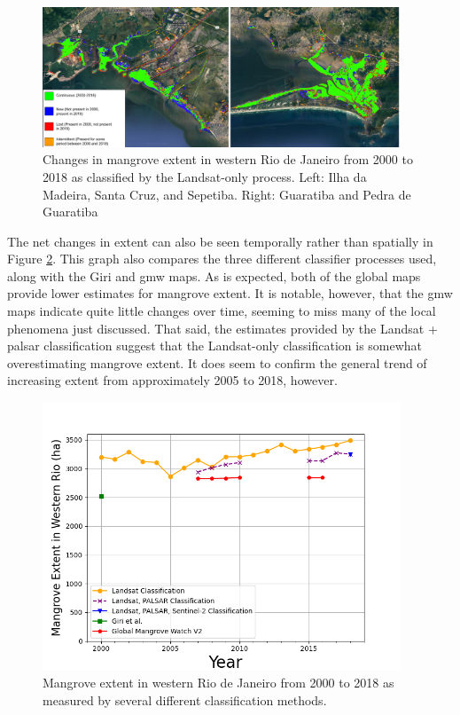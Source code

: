 \begin{figure}[H] 
\centering
\includegraphics[width=0.95\textwidth]{Figures/chap4/extent_changes.png}
\caption[Changes in Mangrove Extent 2000-2018]{Changes in mangrove extent in western Rio de Janeiro from 2000 to 2018 as classified by the Landsat-only process. Left: Ilha da Madeira, Santa Cruz, and Sepetiba. Right: Guaratiba and Pedra de Guaratiba}
\label{fig:extent-changes}
\end{figure}

The net changes in extent can also be seen temporally rather than spatially in Figure \ref{fig:extent-over-time}. This graph also compares the three different classifier processes used, along with the Giri and \ac{gmw} maps. As is expected, both of the global maps provide lower estimates for mangrove extent. It is notable, however, that the \ac{gmw} maps indicate quite little changes over time, seeming to miss many of the local phenomena just discussed. That said, the estimates provided by the Landsat + \ac{palsar} classification suggest that the Landsat-only classification is somewhat overestimating mangrove extent. It does seem to confirm the general trend of  increasing extent from approximately 2005 to 2018, however.  

\begin{figure}[!htb] 
\centering
\includegraphics[width=0.95\textwidth]{Figures/chap4/extent_over_time.png}
\caption[Mangrove Extent Over Time]{Mangrove extent in western Rio de Janeiro from 2000 to 2018 as measured by several different classification methods.}
\label{fig:extent-over-time}
\end{figure}

